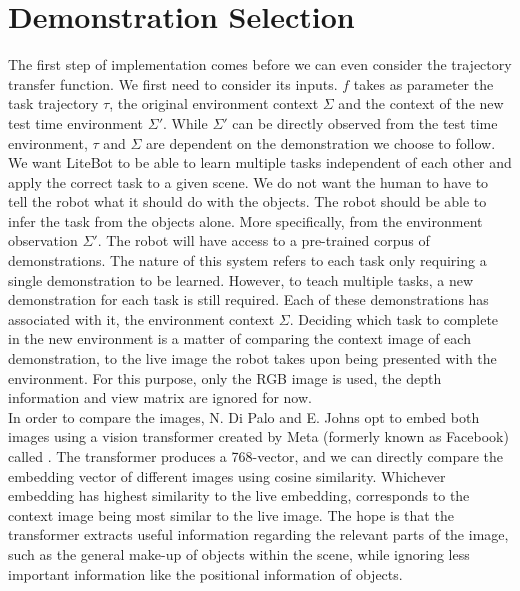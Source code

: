\section{Demonstration Selection}
\label{sec:demo-selection}
The first step of implementation comes before we can even consider the trajectory transfer function. We first need to consider its inputs. $f$ takes as parameter the task trajectory $\tau$, the original environment context $\Sigma$ and the context of the new test time environment $\Sigma'$. While $\Sigma'$ can be directly observed from the test time environment, $\tau$ and $\Sigma$ are dependent on the demonstration we choose to follow.\\

We want LiteBot to be able to learn multiple tasks independent of each other and apply the correct task to a given scene. We do not want the human to have to tell the robot what it should do with the objects. The robot should be able to infer the task from the objects alone. More specifically, from the environment observation $\Sigma'$.
The robot will have access to a pre-trained corpus of demonstrations. The  nature of this system refers to each task only requiring a single demonstration to be learned. However, to teach multiple tasks, a new demonstration for each task is still required. Each of these demonstrations has associated with it, the environment context $\Sigma$. Deciding which task to complete in the new environment is a matter of comparing the context image of each demonstration, to the live image the robot takes upon being presented with the environment. For this purpose, only the RGB image is used, the depth information and view matrix are ignored for now.\\

In order to compare the images, N. Di Palo and E. Johns opt to embed both images using a vision transformer created by Meta (formerly known as Facebook) called  \cite{dino-paper}. The transformer produces a 768-vector, and we can directly compare the embedding vector of different images using cosine similarity. Whichever embedding has highest similarity to the live embedding, corresponds to the context image being most similar to the live image. The hope is that the transformer extracts useful information regarding the relevant parts of the image, such as the general make-up of objects within the scene, while ignoring less important information like the positional information of objects.\\

